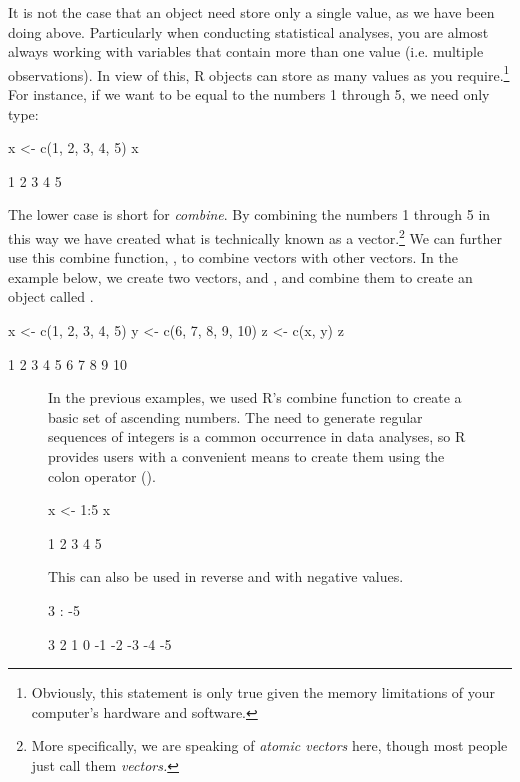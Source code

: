 It is not the case that an object need store only a single value, as we have been doing above. Particularly when conducting statistical analyses, you are almost always working with variables that contain more than one value (i.e. multiple observations). In view of this, R objects can store as many values as you require.\footnote{Obviously, this statement is only true given the memory limitations of your computer's hardware and software.} For instance, if we want  to be equal to the numbers 1 through 5, we need only type: 

\begin{inR}
x <- c(1, 2, 3, 4, 5)
x
\end{inR}

\begin{outR}
[1] 1 2 3 4 5
\end{outR}

The lower case  is short for \textit{combine}. By combining the numbers 1 through 5 in this way we have created what is technically known as a \gls{vector}.\footnote{More specifically, we are speaking of \textit{atomic vectors} here, though most people just call them \textit{vectors.}} We can further use this combine function, , to combine vectors with other vectors. In the example below, we create two vectors,  and , and combine them to create an object called .

\begin{inR}
x <- c(1, 2, 3, 4, 5)
y <- c(6, 7, 8, 9, 10)
z <- c(x, y)
z
\end{inR}
\begin{outR}
[1]  1  2  3  4  5  6  7  8  9 10
\end{outR}

\begin{figure}[!b]
    \centering
\begin{mdframed}[style = miscFrame, frametitle = Box 1.2: How to Use Your Colon Effectively \R{:}]

In the previous examples, we used R's combine function to create a basic set of ascending numbers. The need to generate regular sequences of integers is a common occurrence in data analyses, so R provides users with a convenient means to create them using the \gls{colon operator} (\R{:}).

\begin{inR}
x <- 1:5
x
\end{inR}
\vspace{1cm}
\begin{outR}
[1] 1 2 3 4 5
\end{outR} 

\vspace{\baselineskip}

This can also be used in reverse and with negative values.

\begin{inR}
3 : -5
\end{inR}
\vspace{1cm}
\begin{outR}
[1] 3  2  1  0 -1 -2 -3 -4 -5
\end{outR}

\end{mdframed}
\end{figure}

